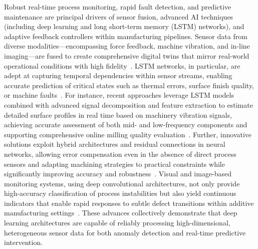 \documentclass[sigconf]{acmart}
\begin{document}
Robust real-time process monitoring, rapid fault detection, and predictive maintenance are principal drivers of sensor fusion, advanced AI techniques (including deep learning and long short-term memory (LSTM) networks), and adaptive feedback controllers within manufacturing pipelines. Sensor data from diverse modalities—encompassing force feedback, machine vibration, and in-line imaging—are fused to create comprehensive digital twins that mirror real-world operational conditions with high fidelity~\cite{ref2, ref5, ref6, ref7, ref15, ref20, ref27, ref44, ref47, ref48, ref58, ref59}. LSTM networks, in particular, are adept at capturing temporal dependencies within sensor streams, enabling accurate prediction of critical states such as thermal errors, surface finish quality, or machine faults~\cite{ref5, ref15, ref48, ref59}. For instance, recent approaches leverage LSTM models combined with advanced signal decomposition and feature extraction to estimate detailed surface profiles in real time based on machinery vibration signals, achieving accurate assessment of both mid- and low-frequency components and supporting comprehensive online milling quality evaluation~\cite{ref48}. Further, innovative solutions exploit hybrid architectures and residual connections in neural networks, allowing error compensation even in the absence of direct process sensors and adapting machining strategies to practical constraints while significantly improving accuracy and robustness~\cite{ref15}. Visual and image-based monitoring systems, using deep convolutional architectures, not only provide high-accuracy classification of process instabilities but also yield continuous indicators that enable rapid responses to subtle defect transitions within additive manufacturing settings~\cite{ref47}. These advances collectively demonstrate that deep learning architectures are capable of reliably processing high-dimensional, heterogeneous sensor data for both anomaly detection and real-time predictive intervention.
\end{document}
